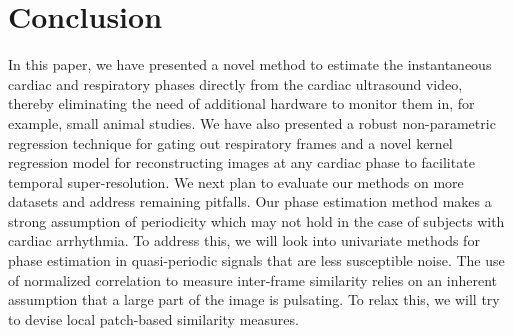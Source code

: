 \documentclass[runningheads,a4paper]{llncs}
\begin{document}
\section{Conclusion}
\label{sec:conclusion}
\vspace{-0.2cm}
%
In this paper, we have presented a novel method to estimate the instantaneous cardiac and respiratory phases directly from the cardiac ultrasound video, thereby eliminating the need of additional hardware to monitor them in, for example, small animal studies. We have also presented a robust non-parametric regression technique for gating out respiratory frames and a novel kernel regression model for reconstructing images at any cardiac phase to facilitate temporal super-resolution. We next plan to evaluate our methods on more datasets and address remaining pitfalls. Our phase estimation method makes a strong assumption of periodicity which may not hold in the case of subjects with cardiac arrhythmia. To address this, we will look into univariate methods for phase estimation in quasi-periodic signals that are less susceptible noise. The use of normalized correlation to measure inter-frame similarity relies on an inherent assumption that a large part of the image is pulsating. To relax this, we will try to devise local patch-based similarity measures. 
%
\vspace{-0.2cm}
%


\end{document}
